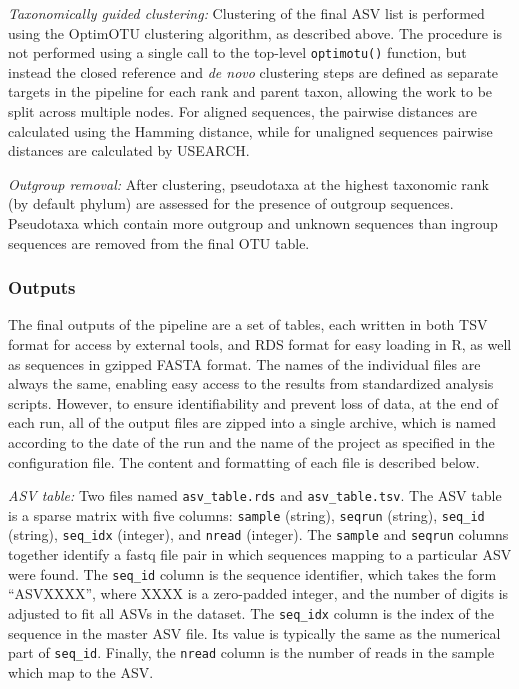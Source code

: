 \documentclass[
]{article}
\begin{document}
\emph{Taxonomically guided clustering:}
Clustering of the final ASV list is performed using the OptimOTU clustering algorithm, as described above.
The procedure is not performed using a single call to the top-level \texttt{optimotu()} function, but instead the closed reference and \emph{de novo} clustering steps are defined as separate targets in the pipeline for each rank and parent taxon, allowing the work to be split across multiple nodes.
For aligned sequences, the pairwise distances are calculated using the Hamming distance, while for unaligned sequences pairwise distances are calculated by USEARCH.

\emph{Outgroup removal:}
After clustering, pseudotaxa at the highest taxonomic rank (by default phylum) are assessed for the presence of outgroup sequences.
Pseudotaxa which contain more outgroup and unknown sequences than ingroup sequences are removed from the final OTU table.

\subsubsection{Outputs}\label{outputs}

The final outputs of the pipeline are a set of tables, each written in both TSV format for access by external tools, and RDS format for easy loading in R, as well as sequences in gzipped FASTA format.
The names of the individual files are always the same, enabling easy access to the results from standardized analysis scripts.
However, to ensure identifiability and prevent loss of data, at the end of each run, all of the output files are zipped into a single archive, which is named according to the date of the run and the name of the project as specified in the configuration file.
The content and formatting of each file is described below.

\emph{ASV table:} Two files named \texttt{asv\_table.rds} and \texttt{asv\_table.tsv}.
The ASV table is a sparse matrix with five columns: \texttt{sample} (string), \texttt{seqrun} (string), \texttt{seq\_id} (string), \texttt{seq\_idx} (integer), and \texttt{nread} (integer).
The \texttt{sample} and \texttt{seqrun} columns together identify a fastq file pair in which sequences mapping to a particular ASV were found.
The \texttt{seq\_id} column is the sequence identifier, which takes the form ``ASVXXXX'', where XXXX is a zero-padded integer, and the number of digits is adjusted to fit all ASVs in the dataset.
The \texttt{seq\_idx} column is the index of the sequence in the master ASV file.
Its value is typically the same as the numerical part of \texttt{seq\_id}.
Finally, the \texttt{nread} column is the number of reads in the sample which map to the ASV.
\end{document}
